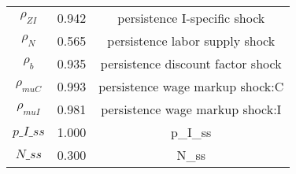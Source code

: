 \begin{center}
\begin{longtable}{ccc}
${\rho_{ZI}}$ 	 & 	 0.942 	 & 	 persistence I-specific shock\\
${\rho_N}$ 	 & 	 0.565 	 & 	 persistence labor supply shock\\
${\rho_b}$ 	 & 	 0.935 	 & 	 persistence discount factor shock\\
${\rho_{muC}}$ 	 & 	 0.993 	 & 	 persistence wage markup shock:C\\
${\rho_{muI}}$ 	 & 	 0.981 	 & 	 persistence wage markup shock:I\\
$p\_I\_ss$ 	 & 	 1.000 	 & 	 p\_I\_ss\\
$N\_ss$ 	 & 	 0.300 	 & 	 N\_ss\\
\bottomrule%
\end{longtable}
\end{center}
